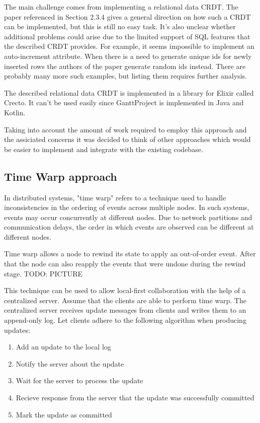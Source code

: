 \documentclass[a4paper, 11pt, oneside]{article}
\theoremstyle{definition}
\begin{document}
The main challenge comes from implementing a relational data CRDT. The paper referenced in Section 2.3.4 gives a general direction on how such a CRDT can be implemented, but this is still no easy task. It's also unclear whether additional problems could arise due to the limited support of SQL features that the described CRDT provides. For example, it seems impossible to implement an auto-increment attribute. When there is a need to generate unique ids for newly inserted rows the authors of the paper generate random ids instead. There are probably many more such examples, but listing them requires further analysis. 

The described relational data CRDT is implemented in a library for Elixir called Crecto. It can't be used easily since GanttProject is implemented in Java and Kotlin. 

Taking into account the amount of work required to employ this approach and the assiciated concerns it was decided to think of other approaches which would be easier to implement and integrate with the existing codebase.


\subsection{Time Warp approach}

In distributed systems, "time warp" refers to a technique used to handle inconsistencies in the ordering of events across multiple nodes. In such systems, events may occur concurrently at different nodes. Due to network partitions and communication delays, the order in which events are observed can be different at different nodes.

Time warp allows a node to rewind its state to apply an out-of-order event. After that the node can also reapply the events that were undone during the rewind stage. TODO: PICTURE

This technique can be used to allow local-first collaboration with the help of a centralized server. Assume that the clients are able to perform time warp. The centralized server receives update messages from clients and writes them to an append-only log. Let clients adhere to the following algorithm when producing updates:

\begin{enumerate}
    \item Add an update to the local log
    \item Notify the server about the update
    \item Wait for the server to process the update
    \item Recieve response from the server that the update was successfully committed
    \item Mark the update as committed
\end{enumerate}
\end{document}
